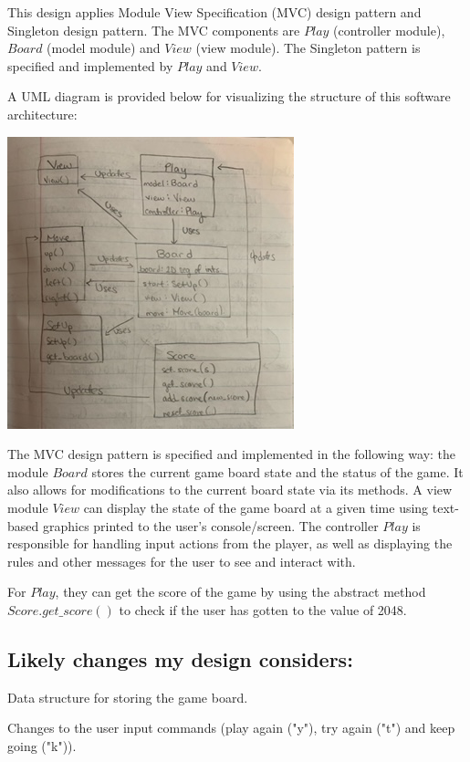\documentclass[12pt]{article}
\begin{document}
This design applies Module View Specification (MVC) design pattern and Singleton design pattern. The MVC components are 
$Play$ (controller module), $Board$ (model module) and $View$ (view module). The Singleton pattern is specified and 
implemented by $Play$ and $View$. 

A UML diagram is provided below for visualizing the structure of this software architecture:

\begin{center}
	\includegraphics[scale=0.7]{image0}
\end{center}

The MVC design pattern is specified and implemented in the following way: the module $Board$ stores the current game board
state and the status of the game. It also allows for modifications to the current board state via its methods. A view module 
$View$ can display the state of the game board at a given time using text-based graphics printed to the user's console/screen. 
The controller $Play$ is responsible for handling input actions from the player, as well as displaying the rules and other 
messages for the user to see and interact with. 

For $Play$, they can get the score of the game by using the abstract method $Score.get\_score()$ to check if the user has 
gotten to the value of 2048. 


\subsection* {Likely changes my design considers:}

\noindent Data structure for storing the game board.

\noindent Changes to the user input commands (play again ("y"), try again ("t") and keep going ("k")).
\end{document}
